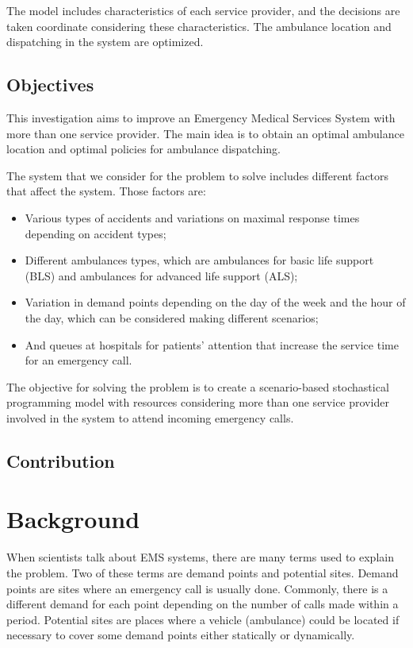 The model includes characteristics of each service provider, and the decisions are taken coordinate considering these characteristics. The ambulance location and dispatching in the system are optimized.


\section{Objectives}
This investigation aims to improve an Emergency Medical Services System with more than one service provider. The main idea is to obtain an optimal ambulance location and optimal policies for ambulance dispatching.

The system that we consider for the problem to solve includes different factors that affect the system. Those factors are:
\begin{itemize}

\item Various types of accidents and variations on maximal response times depending on accident types; 

\item Different ambulances types, which are ambulances for basic life support (BLS) and ambulances for advanced life support (ALS);

\item Variation in demand points depending on the day of the week and the hour of the day, which can be considered making different scenarios;

\item And queues at hospitals for patients' attention that increase the service time for an emergency call.

\end{itemize} 

The objective for solving the problem is to create a scenario-based stochastical programming model with resources considering more than one service provider in\-vol\-ved in the system to attend incoming emergency calls. 


\section{Contribution}



\chapter{Background}\label{cap:back}

When scientists talk about EMS systems, there are many terms used to explain the problem. Two of these terms are demand points and potential sites. Demand points are sites where an emergency call is usually done. Commonly, there is a different demand for each point depending on the number of calls made within a period. Potential sites are places where a vehicle (ambulance) could be located if necessary to cover some demand points either statically or dynamically.

